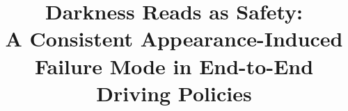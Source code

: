 \documentclass[conference]{IEEEtran}
\begin{document}
\title{Darkness Reads as Safety:\\
A Consistent Appearance-Induced Failure Mode in End-to-End Driving Policies}

\author{
}

\maketitle

\nocite{*}










\appendix

\end{document}
